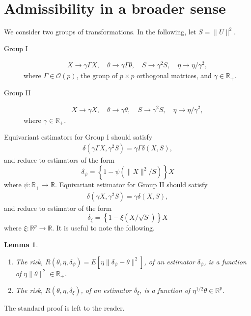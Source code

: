\documentclass[preprint,11pt]{imsart}
\numberwithin{equation}{section}
\theoremstyle{plain}
\newtheorem{lemma}{Lemma}[section]
\theoremstyle{definition}
\theoremstyle{remark}
\begin{document}
\section{Admissibility in a broader sense}
\label{sec:group}
We consider two groups of transformations. In the following, let $S=\|U\|^2$.
\begin{description}
\item[Group I]\label{gI} 
 \begin{align*}
  X\to \gamma\Gamma X, \quad \theta\to \gamma\Gamma \theta, \quad S\to \gamma^2S, \quad \eta\to \eta/\gamma^2,
 \end{align*}
      where $\Gamma\in  \mathcal{O}(p)$, the group of $p\times p$ orthogonal matrices,
      and $\gamma\in\mathbb{R}_+$.
 \item[Group II]\label{gII}
 \begin{align*}
  X\to \gamma X, \quad \theta\to \gamma \theta, \quad S\to \gamma^2S, \quad \eta\to \eta/\gamma^2,
 \end{align*}
where $\gamma\in\mathbb{R}_+$.
\end{description}
Equivariant estimators for Group I should satisfy
\begin{align*}
  \delta(\gamma\Gamma X,\gamma^2S)=\gamma\Gamma \delta(X,S),
\end{align*}
and reduce to estimators of the form 
\begin{equation}\label{eq:equiv.est.0}
 \delta_{\psi}=\left\{1-\psi(\|X\|^2/S)\right\}X
\end{equation}
where $\psi:\mathbb{R}_+\to\mathbb{R}$.
Equivariant estimator for Group II should satisfy
\begin{align*}
  \delta(\gamma X,\gamma^2S)=\gamma \delta(X,S),
\end{align*}
and reduce to estimator of the form 
\begin{equation}\label{eq:equiv.est.1}
 \delta_{\xi}=\left\{1-\xi(X/\sqrt{S})\right\}X
\end{equation}
where $\xi:\mathbb{R}^p\to\mathbb{R}$.
It is useful to note the following.
\begin{lemma}\label{lem:risk.form}
 \begin{enumerate}
  \item 
The risk, $R(\theta,\eta, \delta_{\psi})=E\left[\eta\|\delta_{\psi}-\theta\|^2\right]$,
of an estimator $\delta_{\psi}$, is a function of $\eta\|\theta\|^2\in\mathbb{R}_+$.
\item 
The risk, $R(\theta,\eta, \delta_{\xi})$,
of an estimator $\delta_{\xi}$, is a function of $\eta^{1/2}\theta\in\mathbb{R}^p$.
 \end{enumerate}
\end{lemma}
The standard proof is left to the reader.
\end{document}
